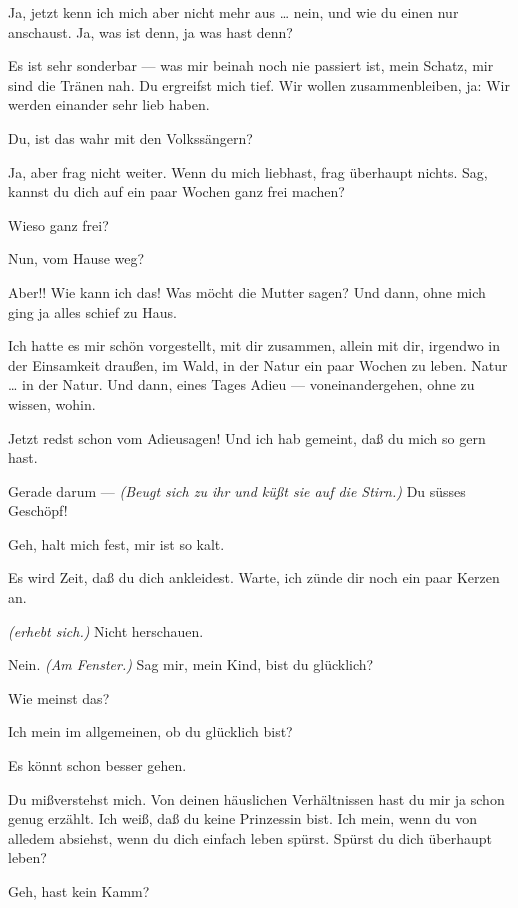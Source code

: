 \documentclass[
	final,
	a4paper,
	ngerman,
	mpinclude = true, %
	twoside = true,
	open = right,
	cleardoublepage = plain,
	DIV = 13,
	BCOR = 1cm,
	titlepage = firstiscover,
	]{scrbook}
\newcommand{\direction}[1]{\textit{(#1)}}
\newcommand{\thecharacter}[1]{\textup{\textsc{#1}}\xspace}
\newcommand{\thesuesse}{\thecharacter{Süßes Mädel}}
\newcommand{\thedichter}{\thecharacter{Dichter}}
\newcommand{\character}[1]{\item[#1:]}
\newcommand{\suesse}{\character{\thesuesse}}
\newcommand{\dichter}{\character{\thedichter}}
\begin{document}
\begin{play}
	\suesse
	Ja, jetzt kenn ich mich aber nicht mehr aus \ldots{} nein, und wie du einen nur anschaust. Ja, was ist denn, ja was hast denn?

	\dichter
	Es ist sehr sonderbar --- was mir beinah noch nie passiert ist, mein Schatz, mir sind die Tränen nah. Du ergreifst mich tief. Wir wollen zusammenbleiben, ja: Wir werden einander sehr lieb haben.

	\suesse
	Du, ist das wahr mit den Volkssängern?

	\dichter
	Ja, aber frag nicht weiter. Wenn du mich liebhast, frag überhaupt nichts. Sag, kannst du dich auf ein paar Wochen ganz frei machen?

	\suesse
	Wieso ganz frei?

	\dichter
	Nun, vom Hause weg?

	\suesse
	Aber!! Wie kann ich das! Was möcht die Mutter sagen? Und dann, ohne mich ging ja alles schief zu Haus.

	\dichter
	Ich hatte es mir schön vorgestellt, mit dir zusammen, allein mit dir, irgendwo in der Einsamkeit draußen, im Wald, in der Natur ein paar Wochen zu leben. Natur \ldots{} in der Natur. Und dann, eines Tages Adieu --- voneinandergehen, ohne zu wissen, wohin.

	\suesse
	Jetzt redst schon vom Adieusagen! Und ich hab gemeint, daß du mich so gern hast.

	\dichter
	Gerade darum --- \direction{Beugt sich zu ihr und küßt sie auf die Stirn.} Du süsses Geschöpf!

	\suesse
	Geh, halt mich fest, mir ist so kalt.

	\dichter
	Es wird Zeit, daß du dich ankleidest. Warte, ich zünde dir noch ein paar Kerzen an.

	\suesse
	\direction{erhebt sich.} Nicht herschauen.

	\dichter
	Nein. \direction{Am Fenster.} Sag mir, mein Kind, bist du glücklich?

	\suesse
	Wie meinst das?

	\dichter
	Ich mein im allgemeinen, ob du glücklich bist?

	\suesse
	Es könnt schon besser gehen.

	\dichter
	Du mißverstehst mich. Von deinen häuslichen Verhältnissen hast du mir ja schon genug erzählt. Ich weiß, daß du keine Prinzessin bist. Ich mein, wenn du von alledem absiehst, wenn du dich einfach leben spürst. Spürst du dich überhaupt leben?

	\suesse
	Geh, hast kein Kamm?


\end{play}
\end{document}
